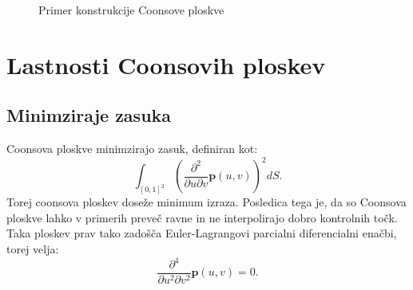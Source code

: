 \documentclass[a4paper,12pt]{article}
\begin{document}
\begin{figure}[ht!]
   \centering
   
   \caption{Primer konstrukcije Coonsove ploskve}
\label{fig:whatever}
\end{figure}


\newpage




\section{Lastnosti Coonsovih ploskev}

\subsection{Minimziraje zasuka}
Coonsova ploskve minimzirajo zasuk, definiran kot:
\begin{equation}
   \label{eq:min}
   \int_{[0,1]^2} \left( \frac{\partial^2}{\partial u \partial v}\mathbf{p}(u,v) \right)^2 dS.
\end{equation}
Torej coonsova ploskev doseže minimum izraza.
Posledica tega je, da so Coonsova ploskve lahko v primerih preveč ravne in ne interpolirajo dobro kontrolnih točk.
Taka ploskev prav tako zadošča Euler-Lagrangovi parcialni diferencialni enačbi, torej velja:
\begin{equation}
   \label{eq:pde}
    \frac{\partial^4}{\partial u^2 \partial v^2}\mathbf{p}(u,v) = 0.
\end{equation}
\end{document}
